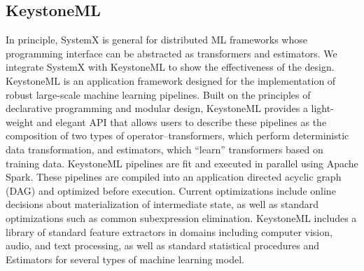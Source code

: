 \documentclass{sig-alternate}
\begin{document}
\subsection{KeystoneML}
In principle, SystemX is general for distributed ML frameworks whose programming interface can be abstracted as transformers and estimators.
We integrate SystemX with KeystoneML to show the effectiveness of the design.
KeystoneML is an application framework designed for the implementation of robust large-scale machine learning pipelines. Built on the principles of declarative programming and modular design, KeystoneML provides a light-weight and elegant API that allows users to describe these pipelines as the composition of two types of operator--transformers, which perform deterministic data transformation, and estimators, which ``learn'' transformers based on training data. KeystoneML pipelines are fit and executed in parallel using Apache Spark. These pipelines are compiled into an application directed acyclic graph (DAG) and optimized before execution. Current optimizations include online decisions about materialization of intermediate state, as well as standard optimizations such as common subexpression elimination. KeystoneML includes a library of standard feature extractors in domains including computer vision, audio, and text processing, as well as standard statistical procedures and Estimators for several types of machine learning model.


\end{document}
